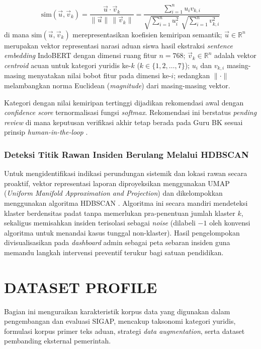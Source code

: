 \documentclass[conference]{IEEEtran}
\begin{document}
\begin{equation}
  \text{sim}(\vec{u}, \vec{v}_k) = \frac{\vec{u} \cdot \vec{v}_k}{\|\vec{u}\|\,\|\vec{v}_k\|} = \frac{\displaystyle\sum_{i=1}^{n} u_i v_{k,i}}{\sqrt{\displaystyle\sum_{i=1}^{n} u_i^2}\;\sqrt{\displaystyle\sum_{i=1}^{n} v_{k,i}^2} }
  \label{eq:cosine}
\end{equation}
di mana $\text{sim}(\vec{u}, \vec{v}_k)$ merepresentasikan koefisien kemiripan semantik; $\vec{u} \in \mathbb{R}^n$ merupakan vektor representasi narasi aduan siswa hasil ekstraksi \textit{sentence embedding} IndoBERT dengan dimensi ruang fitur $n = 768$; $\vec{v}_k \in \mathbb{R}^n$ adalah vektor \textit{centroid} acuan untuk kategori yuridis ke-$k$ ($k \in \{1, 2, \dots, 7\}$); $u_i$ dan $v_{k,i}$ masing-masing menyatakan nilai bobot fitur pada dimensi ke-$i$; sedangkan $\|\cdot\|$ melambangkan norma Euclidean (\textit{magnitude}) dari masing-masing vektor.

Kategori dengan nilai kemiripan tertinggi dijadikan rekomendasi awal dengan \textit{confidence score} ternormalisasi fungsi \textit{softmax}. Rekomendasi ini berstatus \textit{pending review} di mana keputusan verifikasi akhir tetap berada pada Guru BK sesuai prinsip \textit{human-in-the-loop} \cite{sele2024,nabiilah2024}.

\subsubsection{Deteksi Titik Rawan Insiden Berulang Melalui HDBSCAN}
Untuk mengidentifikasi indikasi perundungan sistemik dan lokasi rawan secara proaktif, vektor representasi laporan diproyeksikan menggunakan UMAP (\textit{Uniform Manifold Approximation and Projection}) \cite{grootendorst2022} dan dikelompokkan menggunakan algoritma HDBSCAN \cite{malzer2020,hanny2024}. Algoritma ini secara mandiri mendeteksi klaster berdensitas padat tanpa memerlukan pra-penentuan jumlah klaster $k$, sekaligus memisahkan insiden terisolasi sebagai \textit{noise} (dilabeli $-1$ oleh konvensi algoritma untuk menandai kasus tunggal non-klaster). Hasil pengelompokan divisualisasikan pada \textit{dashboard} admin sebagai peta sebaran insiden guna memandu langkah intervensi preventif terukur bagi satuan pendidikan.

\section{DATASET PROFILE}

Bagian ini menguraikan karakteristik korpus data yang digunakan dalam pengembangan dan evaluasi SIGAP, mencakup taksonomi kategori yuridis, formulasi korpus primer teks aduan, strategi \textit{data augmentation}, serta dataset pembanding eksternal pemerintah.
\end{document}
